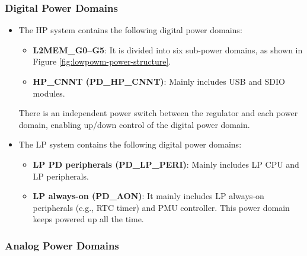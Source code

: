 \documentclass[main\_\_EN.tex]{subfiles}
\begin{document}
\subsubsection{Digital Power Domains}\label{sec:lowpowm_digital_domain}

\begin{itemize}
    \item The HP system contains the following digital power domains:
    \begin{itemize}

        \item \textbf{L2MEM\_G0–G5}: It is divided into six sub-power domains, as shown in Figure \ref{fig:lowpowm-power-structure}.

        \item \textbf{HP\_CNNT (PD\_HP\_CNNT)}: Mainly includes USB and SDIO modules.
    \end{itemize}

There is an independent power switch between the regulator and each power domain, enabling up/down control of the digital power domain.

    \item The LP system contains the following digital power domains:
    \begin{itemize}
        \item \textbf{LP PD peripherals (PD\_LP\_PERI)}: Mainly includes LP CPU and LP peripherals.
        \item \textbf{LP always-on (PD\_AON)}: It mainly includes LP always-on peripherals (e.g., RTC timer) and PMU controller. This power domain keeps powered up all the time.
    \end{itemize}
\end{itemize}

\subsubsection{Analog Power Domains}
\end{document}
